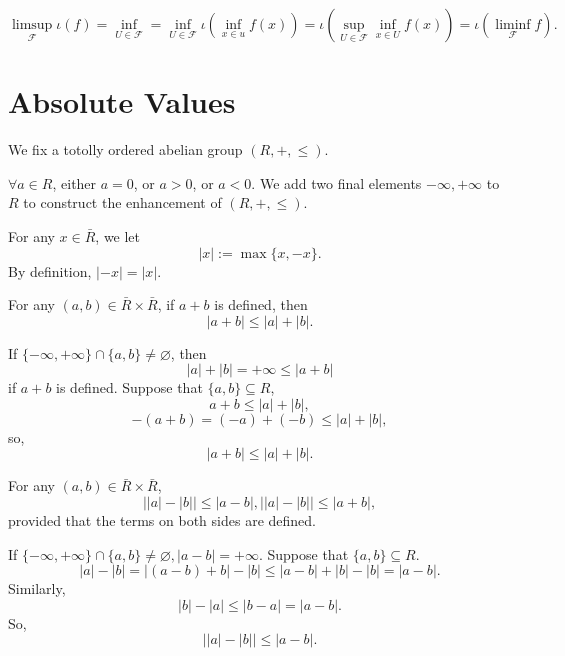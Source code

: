 \begin{proofenv}
    $$\limsup_{\mathcal{F}}\iota(f)=\inf_{U\in \mathcal{F}}=\inf_{U\in \mathcal{F}}\iota\left(\inf_{x\in u}f(x)\right)=\iota\left(\sup_{U\in \mathcal{F}}\inf_{x\in U}f(x)\right)=\iota\left(\liminf_{\mathcal{F}}f\right).$$
\end{proofenv}



\section{Absolute Values}
We fix a totolly ordered abelian group $(R,+,\le)$.
\begin{remark}
    $\forall a\in R$, either $a=0$, or $a>0$, or $a<0$. We add two final elements $-\infty,+\infty$ to $R$ to construct the enhancement of $(R,+,\le)$.
\end{remark}
\begin{definitionenv}
    For any $x\in \bar{R}$, we let 
    $$\left|x\right|:=\max\{x,-x\}.$$
    By definition, $\left|-x\right|=\left|x\right|$.
\end{definitionenv}
\begin{propositionenv}
    For any $(a,b)\in \bar{R}\times\bar{R}$, if $a+b$ is defined, then 
    $$\left|a+b\right|\le \left|a\right|+\left| b\right|.$$
\end{propositionenv}
\begin{proofenv}
    If $\{-\infty,+\infty\}\cap\{a,b\}\not=\varnothing$, then 
    $$\left|a\right|+\left|b\right|=+\infty\le\left|a+b\right|$$
    if $a+b$ is defined. Suppose that $\{a,b\}\subseteq R$, 
    $$a+b\le \left|a\right|+\left|b\right|,$$
    $$-\left(a+b\right)=\left(-a\right)+\left(-b\right)\le \left|a\right|+\left|b\right|,$$
    so,
    $$\left|a+b\right|\le \left|a\right|+\left| b\right|.$$
\end{proofenv}
\begin{corollaryenv}
    For any $(a,b)\in \bar{R}\times\bar{R}$,
    $$\left|\left|a\right|-\left|b\right|\right|\le \left|a-b\right|,\left|\left|a\right|-\left|b\right|\right|\le \left|a+b\right|,$$
    provided that the terms on both sides are defined.
\end{corollaryenv}
\begin{proofenv}
    If $\{-\infty,+\infty\}\cap\{a,b\}\not=\varnothing, \left|a-b\right|=+\infty$. Suppose that $\{a,b\}\subseteq R$.
    $$\left|a\right|-\left|b\right|=\left|(a-b)+b\right|-\left|b\right|\le \left|a-b\right|+\left|b\right|-\left|b\right|=\left|a-b\right|.$$
    Similarly, 
    $$\left|b\right|-\left|a\right|\le \left|b-a\right|=\left|a-b\right|.$$
    So,
    $$\left|\left|a\right|-\left|b\right|\right|\le\left|a-b\right|.$$
\end{proofenv}
